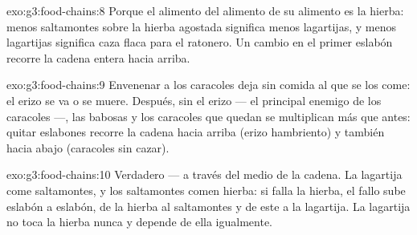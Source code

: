 \begin{solution}{exo:g3:food-chains:8}
Porque el alimento del alimento de su alimento es la hierba: menos
saltamontes sobre la hierba agostada significa menos lagartijas, y
menos lagartijas significa caza flaca para el ratonero. Un cambio en
el primer eslabón recorre la cadena entera hacia arriba.
\end{solution}

\begin{solution}{exo:g3:food-chains:9}
Envenenar a los caracoles deja sin comida al que se los come: el erizo
se va o se muere. Después, sin el erizo --- el principal enemigo de
los caracoles ---, las babosas y los caracoles que quedan se
multiplican más que antes: quitar eslabones recorre la cadena hacia
arriba (erizo hambriento) y también hacia abajo (caracoles sin cazar).
\end{solution}

\begin{solution}{exo:g3:food-chains:10}
Verdadero --- a través del medio de la cadena. La lagartija come
saltamontes, y los saltamontes comen hierba: si falla la hierba, el
fallo sube eslabón a eslabón, de la hierba al saltamontes y de este a
la lagartija. La lagartija no toca la hierba nunca y depende de ella
igualmente.
\end{solution}
